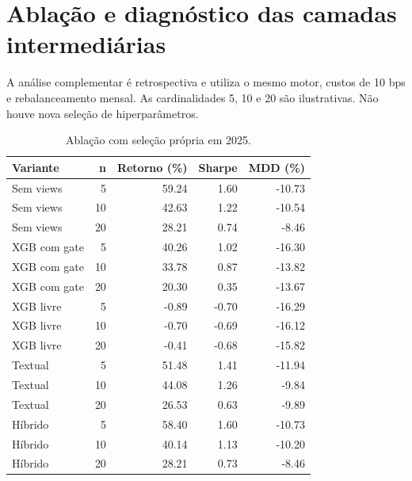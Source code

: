 \section{Ablação e diagnóstico das camadas intermediárias}

A análise complementar é retrospectiva e utiliza o mesmo motor, custos de 10 bps e rebalanceamento mensal. As cardinalidades 5, 10 e 20 são ilustrativas. Não houve nova seleção de hiperparâmetros.

\begin{table}[H]\centering\caption{Ablação com seleção própria em 2025.}

\begin{tabular}{lrrrr}\hline Variante & n & Retorno (\%) & Sharpe & MDD (\%) \\ \hline

Sem views & 5 & 59.24 & 1.60 & -10.73 \\

Sem views & 10 & 42.63 & 1.22 & -10.54 \\

Sem views & 20 & 28.21 & 0.74 & -8.46 \\

XGB com gate & 5 & 40.26 & 1.02 & -16.30 \\

XGB com gate & 10 & 33.78 & 0.87 & -13.82 \\

XGB com gate & 20 & 20.30 & 0.35 & -13.67 \\

XGB livre & 5 & -0.89 & -0.70 & -16.29 \\

XGB livre & 10 & -0.70 & -0.69 & -16.12 \\

XGB livre & 20 & -0.41 & -0.68 & -15.82 \\

Textual & 5 & 51.48 & 1.41 & -11.94 \\

Textual & 10 & 44.08 & 1.26 & -9.84 \\

Textual & 20 & 26.53 & 0.63 & -9.89 \\

Híbrido & 5 & 58.40 & 1.60 & -10.73 \\

Híbrido & 10 & 40.14 & 1.13 & -10.20 \\

Híbrido & 20 & 28.21 & 0.73 & -8.46 \\

\hline\end{tabular}\par{}\end{table}


